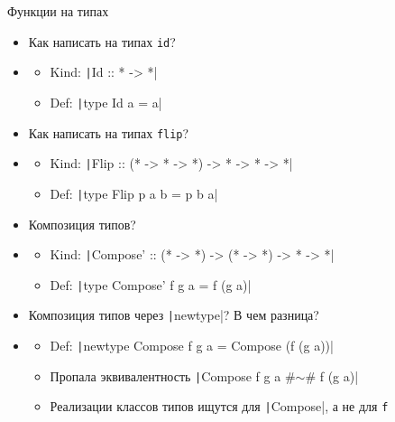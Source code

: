     \begin{frame}[fragile]{Функции на типах}
        \begin{itemize}
            \item[\todo] Как написать на типах \texttt{id}?
            \item[\answer] \pause
            \begin{itemize}
                \item Kind: \texttt|Id :: * -> *|
                \item Def: \texttt|type Id a = a|
            \end{itemize}
            \item[\todo] \pause Как написать на типах \texttt{flip}?
            \item[\answer] \pause
            \begin{itemize}
                \item Kind: \texttt|Flip :: (* -> * -> *) -> * -> * -> *|
                \item Def: \texttt|type Flip p a b = p b a|
            \end{itemize}
            \item[\todo] \pause Композиция типов?
            \item[\answer] \pause
            \begin{itemize}
                \item Kind: \texttt|Compose' :: (* -> *) -> (* -> *) -> * -> *|
                \item Def: \texttt|type Compose' f g a = f (g a)|
            \end{itemize}
            \item[\todo] \pause Композиция типов через \texttt|newtype|? В чем разница?
            \item[\answer] \pause
            \begin{itemize}
                \item Def: \texttt|newtype Compose f g a = Compose (f (g a))|
                \item Пропала эквивалентность \texttt|Compose f g a #$\sim$# f (g a)|
                \item[\NB] Реализации классов типов ищутся для \texttt|Compose|, а не для \texttt{f}
            \end{itemize}
        \end{itemize}
    \end{frame}

